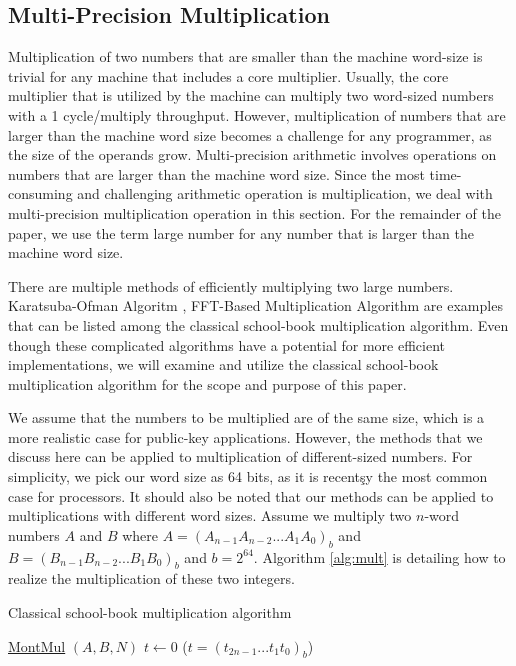 \documentclass[twocolumn]{svjour3}          %
\begin{document}
\subsection{Multi-Precision Multiplication}
Multiplication of two numbers that are smaller than the machine word-size is trivial for any machine that includes a core multiplier. Usually, the core multiplier that is utilized by the machine can multiply two word-sized numbers with a 1 cycle/multiply throughput. However, multiplication of numbers that are larger than the machine word size becomes a challenge for any programmer, as the size of the operands grow. Multi-precision arithmetic involves operations on numbers that are larger than the machine word size. Since the most time-consuming and challenging arithmetic operation is multiplication, we deal with multi-precision multiplication operation in this section. For the remainder of the paper, we use the term large number for any number that is larger than the machine word size.

There are multiple methods of efficiently multiplying two large numbers. Karatsuba-Ofman Algoritm \cite{karatsuba}, FFT-Based Multiplication Algorithm \cite{Schonhage1971} are examples that can be listed among the classical school-book multiplication algorithm. Even though these complicated algorithms have a potential for more efficient implementations, we will examine and utilize the classical school-book multiplication algorithm for the scope and purpose of this paper. 

We assume that the numbers to be multiplied are of the same size, which is a more realistic case for public-key applications. However, the methods that we discuss here can be applied to multiplication of different-sized numbers. For simplicity, we pick our word size as 64 bits, as it is recentşy the most common case for processors. It should also be noted that our methods can be applied to multiplications with different word sizes. Assume we multiply two $n$-word numbers $A$ and $B$ where $A = (A_{n-1}A_{n-2}...A_1A_0)_b$ and $B = (B_{n-1}B_{n-2}...B_1B_0)_b$ and $b=2^{64}$. Algorithm \ref{alg:mult} is detailing how to realize the multiplication of these two integers. 

\begin{algorithm}
\label{alg:mult}
\caption{Classical school-book multiplication algorithm}
\underline{MontMul} $(A,B,N)$\;
$\textit{t} \gets 0$ ($t=(t_{2n-1}...t_1t_0)_b$)\\
\end{algorithm}
\end{document}
